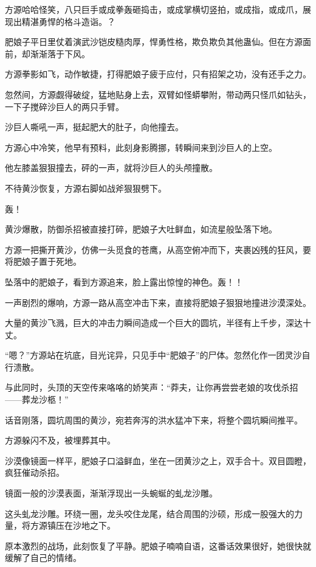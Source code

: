 
\begin{this_body}

方源哈哈怪笑，八只巨手或成拳轰砸捣击，或成掌横切竖拍，或成指，或成爪，展现出精湛勇悍的格斗造诣。？

肥娘子平日里仗着演武沙铠皮糙肉厚，悍勇性格，欺负欺负其他蛊仙。但在方源面前，却渐渐落于下风。

方源拳影如飞，动作敏捷，打得肥娘子疲于应付，只有招架之功，没有还手之力。

忽然间，方源觑得破绽，猛地贴身上去，双臂如怪蟒攀附，带动两只怪爪如钻头，一下子搅碎沙巨人的两只手臂。

沙巨人嘶吼一声，挺起肥大的肚子，向他撞去。

方源心中冷笑，他早有预料，此刻身影腾挪，转瞬间来到沙巨人的上空。

他左膝盖狠狠撞去，砰的一声，就将沙巨人的头颅撞散。

不待黄沙恢复，方源右脚如战斧狠狠劈下。

轰！

黄沙爆散，防御杀招被直接打碎，肥娘子大吐鲜血，如流星般坠落下地。

方源一把撕开黄沙，仿佛一头觅食的苍鹰，从高空俯冲而下，夹裹凶残的狂风，要将肥娘子置于死地。

坠落中的肥娘子，看到方源追来，脸上露出惊惶的神色。轰！！

一声剧烈的爆响，方源一路从高空冲击下来，直接将肥娘子狠狠地撞进沙漠深处。

大量的黄沙飞溅，巨大的冲击力瞬间造成一个巨大的圆坑，半径有上千步，深达十丈。

“嗯？”方源站在坑底，目光诧异，只见手中“肥娘子”的尸体。忽然化作一团灵沙自行溃散。

与此同时，头顶的天空传来咯咯的娇笑声：“莽夫，让你再尝尝老娘的攻伐杀招——葬龙沙柩！”

话音刚落，圆坑周围的黄沙，宛若奔泻的洪水猛冲下来，将整个圆坑瞬间推平。

方源躲闪不及，被埋葬其中。

沙漠像镜面一样平，肥娘子口溢鲜血，坐在一团黄沙之上，双手合十。双目圆瞪，疯狂催动杀招。

镜面一般的沙漠表面，渐渐浮现出一头蜿蜒的虬龙沙雕。

这头虬龙沙雕。环绕一圈，龙头咬住龙尾，结合周围的沙硕，形成一股强大的力量，将方源镇压在沙地之下。

原本激烈的战场，此刻恢复了平静。肥娘子喃喃自语，这番话效果很好，她很快就缓解了自己的情绪。


\end{this_body}
